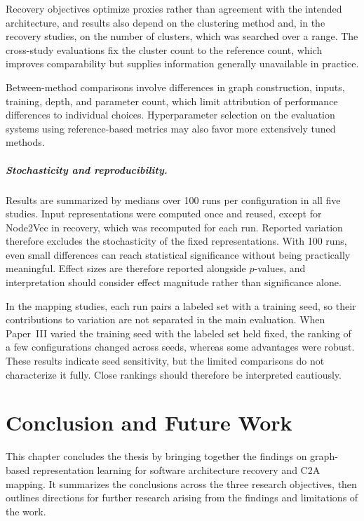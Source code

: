 Recovery objectives optimize proxies rather than agreement with the intended architecture, and results also depend on the clustering method and, in the recovery studies, on the number of clusters, which was searched over a range. The cross-study evaluations fix the cluster count to the reference count, which improves comparability but supplies information generally unavailable in practice.

Between-method comparisons involve differences in graph construction, inputs, training, depth, and parameter count, which limit attribution of performance differences to individual choices. Hyperparameter selection on the evaluation systems using reference-based metrics may also favor more extensively tuned methods.

\paragraph{Stochasticity and reproducibility.} Results are summarized by medians over 100 runs per configuration in all five studies. Input representations were computed once and reused, except for Node2Vec in recovery, which was recomputed for each run. Reported variation therefore excludes the stochasticity of the fixed representations. With 100 runs, even small differences can reach statistical significance without being practically meaningful. Effect sizes are therefore reported alongside $p$-values, and interpretation should consider effect magnitude rather than significance alone.

In the mapping studies, each run pairs a labeled set with a training seed, so their contributions to variation are not separated in the main evaluation. When Paper~III varied the training seed with the labeled set held fixed, the ranking of a few configurations changed across seeds, whereas some advantages were robust. These results indicate seed sensitivity, but the limited comparisons do not characterize it fully. Close rankings should therefore be interpreted cautiously.

\chapter[Conclusion]{Conclusion and Future Work \label{ch:conclusion}}
\chaptertoc

This chapter concludes the thesis by bringing together the findings on graph-based representation learning for software architecture recovery and C2A mapping. It summarizes the conclusions across the three research objectives, then outlines directions for further research arising from the findings and limitations of the work.

